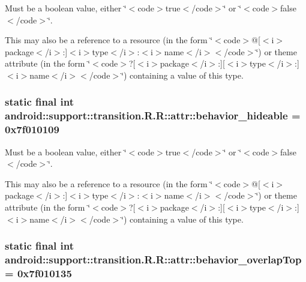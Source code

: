 Must be a boolean value, either \char`\"{}$<$code$>$true$<$/code$>$\char`\"{} or \char`\"{}$<$code$>$false$<$/code$>$\char`\"{}. 

This may also be a reference to a resource (in the form \char`\"{}$<$code$>$@\mbox{[}$<$i$>$package$<$/i$>$:\mbox{]}$<$i$>$type$<$/i$>$:$<$i$>$name$<$/i$>$$<$/code$>$\char`\"{}) or theme attribute (in the form \char`\"{}$<$code$>$?\mbox{[}$<$i$>$package$<$/i$>$:\mbox{]}\mbox{[}$<$i$>$type$<$/i$>$:\mbox{]}$<$i$>$name$<$/i$>$$<$/code$>$\char`\"{}) containing a value of this type. \hypertarget{classandroid_1_1support_1_1transition_1_1_r_1_1attr_3e2f80ec90edef8b697df430cfc91dad}{
\subsubsection[{behavior\_\-hideable}]{\setlength{\rightskip}{0pt plus 5cm}static final int android::support::transition.R.R::attr::behavior\_\-hideable = 0x7f010109}}
\label{classandroid_1_1support_1_1transition_1_1_r_1_1attr_3e2f80ec90edef8b697df430cfc91dad}


Must be a boolean value, either \char`\"{}$<$code$>$true$<$/code$>$\char`\"{} or \char`\"{}$<$code$>$false$<$/code$>$\char`\"{}. 

This may also be a reference to a resource (in the form \char`\"{}$<$code$>$@\mbox{[}$<$i$>$package$<$/i$>$:\mbox{]}$<$i$>$type$<$/i$>$:$<$i$>$name$<$/i$>$$<$/code$>$\char`\"{}) or theme attribute (in the form \char`\"{}$<$code$>$?\mbox{[}$<$i$>$package$<$/i$>$:\mbox{]}\mbox{[}$<$i$>$type$<$/i$>$:\mbox{]}$<$i$>$name$<$/i$>$$<$/code$>$\char`\"{}) containing a value of this type. \hypertarget{classandroid_1_1support_1_1transition_1_1_r_1_1attr_757c89573bac2faad9209b2ecf04a6f3}{
\subsubsection[{behavior\_\-overlapTop}]{\setlength{\rightskip}{0pt plus 5cm}static final int android::support::transition.R.R::attr::behavior\_\-overlapTop = 0x7f010135}}
\label{classandroid_1_1support_1_1transition_1_1_r_1_1attr_757c89573bac2faad9209b2ecf04a6f3}


